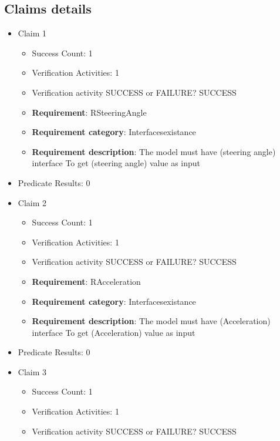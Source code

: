 \documentclass{article}
\begin{document}
			\subsection{Claims details}
			\begin{itemize}
  				  \item Claim 1
				\begin{itemize}
			    	\item Success Count: 1 
			    	\item Verification Activities: 1
					\item Verification activity SUCCESS or FAILURE? SUCCESS
		
						\item \textbf{Requirement}: RSteeringAngle 
						\item \textbf{Requirement category}: Interfacesexistance 
						\item \textbf{Requirement description}: The model must have (steering angle) interface To get (steering angle) value as input
					
				\end{itemize}
				
									    
				\item Predicate Results: 0

  				  \item Claim 2
				\begin{itemize}
			    	\item Success Count: 1 
			    	\item Verification Activities: 1
					\item Verification activity SUCCESS or FAILURE? SUCCESS
		
						\item \textbf{Requirement}: RAcceleration 
						\item \textbf{Requirement category}: Interfacesexistance 
						\item \textbf{Requirement description}: The model must have (Acceleration) interface To get (Acceleration) value as input
					
				\end{itemize}
				
									    
				\item Predicate Results: 0

  				  \item Claim 3
				\begin{itemize}
			    	\item Success Count: 1 
			    	\item Verification Activities: 1
					\item Verification activity SUCCESS or FAILURE? SUCCESS
		

\end{itemize}
\end{itemize}
\end{document}
